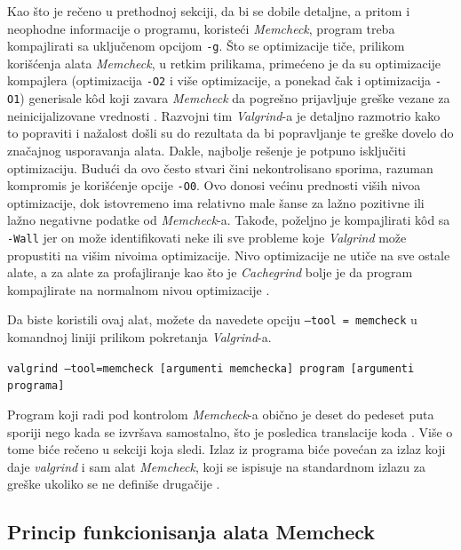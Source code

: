 \documentclass[12pt,oneside]{memoir}
\theoremstyle{plain}
\theoremstyle{definition}
\begin{document}
Kao što je rečeno u prethodnoj sekciji, da bi se dobile detaljne, a pritom i neophodne informacije o programu, koristeći \textit{Memcheck}, program treba kompajlirati sa uključenom opcijom \texttt{-g}. Što se optimizacije tiče, prilikom korišćenja alata \textit{Memcheck}, u retkim prilikama, primećeno je da su optimizacije kompajlera (optimizacija \texttt{-O2} i više optimizacije, a ponekad čak i optimizacija \texttt{-O1}) generisale k\^od koji zavara \textit{Memcheck} da pogrešno prijavljuje greške vezane za neinicijalizovane vrednosti \cite{ValgrindCore}. Razvojni tim \textit{Valgrind}-a je detaljno razmotrio kako to popraviti i nažalost došli su do rezultata da bi popravljanje te greške dovelo do značajnog usporavanja alata. Dakle, najbolje rešenje je potpuno isključiti optimizaciju. Budući da ovo često stvari čini nekontrolisano sporima, razuman kompromis je korišćenje opcije \texttt{-O0}. Ovo donosi većinu prednosti viših nivoa optimizacije, dok istovremeno ima relativno male šanse za lažno pozitivne ili lažno negativne podatke od \textit{Memcheck}-a. Takođe, poželjno je kompajlirati k\^od sa \texttt{-Wall} jer on može identifikovati neke ili sve probleme koje \textit{Valgrind} može propustiti na višim nivoima optimizacije. Nivo optimizacije ne utiče na sve ostale alate, a za alate za profajliranje kao što je \textit{Cachegrind} bolje je da program kompajlirate na normalnom nivou optimizacije \cite{ValgrindCore}. 


Da biste koristili ovaj alat, možete da navedete opciju \texttt{--tool = memcheck} u komandnoj liniji prilikom pokretanja \textit{Valgrind}-a.
 \begin{center}
\texttt{valgrind –tool=memcheck [argumenti memchecka] program [argumenti programa]}
\end{center}

Program koji radi pod kontrolom \textit{Memcheck}-a obično je deset do pedeset puta sporiji nego kada se izvršava samostalno, što je posledica translacije koda \cite{ValgrindCore}. Više o tome biće rečeno u sekciji koja sledi. Izlaz iz programa biće povećan za izlaz koji daje \textit{valgrind} i sam alat \textit{Memcheck}, koji se ispisuje na standardnom izlazu za greške ukoliko se ne definiše drugačije \cite{ValgrindDOC}. 

\subsection{Princip funkcionisanja alata Memcheck}
\end{document}
